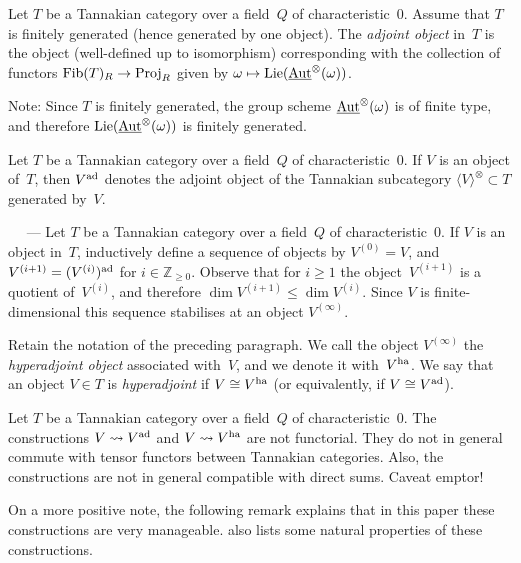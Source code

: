 \documentclass[10pt,twoside,leqno]{article}
\renewcommand{\paragraph}[1]{\par\bigskip\refstepcounter{subsection}%
 {\normalfont\normalsize\scshape\noindent\thesubsection%
 \ifthenelse{\equal{#1}{}}%
 {}%
 {\ \textls{#1.}}%
 \ ---}%
}
\numberwithin{equation}{subsection}
\newcommand{\Aut}{\textnormal{Aut}}
\newcommand{\iAut}{\underline{\Aut}}
\newcommand{\ZZ}{\mathbb{Z}}
\newcommand{\Lie}{\textnormal{Lie}}
\newcommand{\ad}{\textnormal{ad}}
\newcommand{\ha}{\textnormal{ha}}
\newcommand{\Fib}{\textnormal{Fib}}
\newcommand{\Proj}{\textnormal{Proj}}
\newcommand{\Tangen}[1]{\langle #1 \rangle^{\otimes}}
\begin{document}
\begin{definition} %
 Let $T$ be a Tannakian category over a field~$Q$ of characteristic~$0$.
 Assume that $T$ is finitely generated (hence generated by one object).
 The \emph{adjoint object} in~$T$ is the object
 (well-defined up to isomorphism)
 corresponding with the collection of functors
 $\Fib(T)_R \to \Proj_R$ given by $\omega \mapsto \Lie(\iAut^\otimes(\omega))$.
 
 Note: Since $T$ is finitely generated,
 the group scheme $\iAut^\otimes(\omega)$ is of finite type,
 and therefore $\Lie(\iAut^\otimes(\omega))$ is finitely generated.
\end{definition}

\begin{notation} %
 Let $T$ be a Tannakian category over a field~$Q$ of characteristic~$0$.
 If $V$ is an object of~$T$,
 then $V^\ad$ denotes the adjoint object
 of the Tannakian subcategory $\Tangen{V} \subset T$ generated by~$V$.
\end{notation}

\paragraph{} %
Let $T$ be a Tannakian category over a field~$Q$ of characteristic~$0$.
If $V$ is an object in~$T$,
inductively define a sequence of objects by $V^{(0)} = V$,
and $V^{(i+1)} = (V^{(i)})^\ad$ for $i \in \ZZ_{\ge0}$.
Observe that for $i \ge 1$ the object~$V^{(i+1)}$ is a quotient of~$V^{(i)}$,
and therefore $\dim V^{(i+1)} \le \dim V^{(i)}$.
Since $V$ is finite-dimensional
this sequence stabilises at an object $V^{(\infty)}$.

\begin{definition} %
 \label{ha-obj}
 Retain the notation of the preceding paragraph.
 We call the object $V^{(\infty)}$ the \emph{hyperadjoint object}
 associated with~$V$, and we denote it with~$V^\ha$.
 We say that an object $V \in T$ is \emph{hyperadjoint} if $V \cong V^\ha$
 (or equivalently, if $V \cong V^\ad$).
\end{definition}

\begin{remark} %
 Let $T$ be a Tannakian category over a field~$Q$ of characteristic~$0$.
 The constructions $V \rightsquigarrow V^\ad$ and $V \rightsquigarrow V^\ha$
 are not functorial.
 They do not in general commute with
 tensor functors between Tannakian categories.
 Also, the constructions are not in general compatible with direct sums.
 Caveat emptor!

 On a more positive note, the following remark explains that in this paper
 these constructions are very manageable.
  also lists some natural properties of these constructions.
\end{remark}
\end{document}
